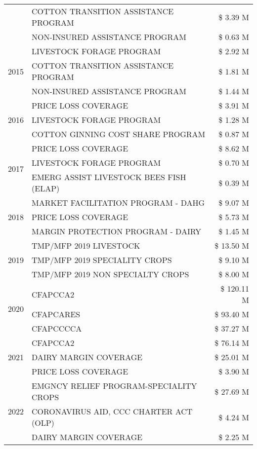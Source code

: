 \begin{tabular}{llr}
 & COTTON TRANSITION ASSISTANCE PROGRAM & \$ 3.39 M \\
 & NON-INSURED ASSISTANCE PROGRAM & \$ 0.63 M \\
\cline{1-3}
\multirow[t]{3}{*}{2015} & LIVESTOCK FORAGE PROGRAM & \$ 2.92 M \\
 & COTTON TRANSITION ASSISTANCE PROGRAM & \$ 1.81 M \\
 & NON-INSURED ASSISTANCE PROGRAM & \$ 1.44 M \\
\cline{1-3}
\multirow[t]{3}{*}{2016} & PRICE LOSS COVERAGE & \$ 3.91 M \\
 & LIVESTOCK FORAGE PROGRAM & \$ 1.28 M \\
 & COTTON GINNING COST SHARE PROGRAM & \$ 0.87 M \\
\cline{1-3}
\multirow[t]{3}{*}{2017} & PRICE LOSS COVERAGE & \$ 8.62 M \\
 & LIVESTOCK FORAGE PROGRAM & \$ 0.70 M \\
 & EMERG ASSIST LIVESTOCK BEES FISH (ELAP) & \$ 0.39 M \\
\cline{1-3}
\multirow[t]{3}{*}{2018} & MARKET FACILITATION PROGRAM - DAHG & \$ 9.07 M \\
 & PRICE LOSS COVERAGE & \$ 5.73 M \\
 & MARGIN PROTECTION PROGRAM - DAIRY & \$ 1.45 M \\
\cline{1-3}
\multirow[t]{3}{*}{2019} & TMP/MFP 2019 LIVESTOCK & \$ 13.50 M \\
 & TMP/MFP 2019 SPECIALITY CROPS & \$ 9.10 M \\
 & TMP/MFP 2019 NON SPECIALTY CROPS & \$ 8.00 M \\
\cline{1-3}
\multirow[t]{3}{*}{2020} & CFAPCCA2 & \$ 120.11 M \\
 & CFAPCARES & \$ 93.40 M \\
 & CFAPCCCCA & \$ 37.27 M \\
\cline{1-3}
\multirow[t]{3}{*}{2021} & CFAPCCA2 & \$ 76.14 M \\
 & DAIRY MARGIN COVERAGE & \$ 25.01 M \\
 & PRICE LOSS COVERAGE & \$ 3.90 M \\
\cline{1-3}
\multirow[t]{3}{*}{2022} & EMGNCY RELIEF PROGRAM-SPECIALITY CROPS & \$ 27.69 M \\
 & CORONAVIRUS AID, CCC CHARTER ACT (OLP) & \$ 4.24 M \\
 & DAIRY MARGIN COVERAGE & \$ 2.25 M \\
\cline{1-3}
\bottomrule
\end{tabular}
